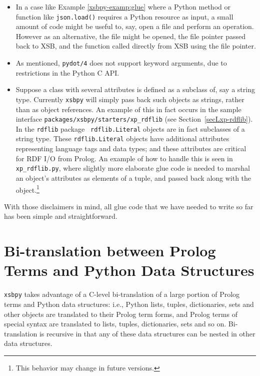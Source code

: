 \begin{itemize}
\item In a case like Example \ref{xsbpy-examp:glue} where a Python
  method or function like {\tt json.load()} requires a Python resource
  as input, a small amount of code might be useful to, say, open a
  file and perform an operation.  However as an alternative, the file
  might be opened, the file pointer passed back to XSB, and the
  function called directly from XSB using the file pointer.

  \item As mentioned, {\tt pydot/4} does not support keyword
    arguments, due to restrictions in the Python C API.

  \item Suppose a class with several attributes is defined as a
    subclass of, say a string type.  Currently {\tt xsbpy} will simply
    pass back such objects as strings, rather than as object
    references.  An example of this in fact occurs in the sample
    interface {\tt packages/xsbpy/starters/xp\_rdflib} (see
    Section~\ref{secLxp-rdflib}).  In the {\tt rdflib} package {\tt
      rdflib.Literal} objects are in fact subclasses of a string type.
    These {\tt rdflib.Literal} objects have additional attributes
    representing language tags and data types; and these attributes
    are critical for RDF I/O from Prolog.  An example of how to handle
    this is seen in {\tt xp\_rdflib.py}, where slightly more elaborate
    glue code is needed to marshal an object's attributes as elements
    of a tuple, and passed back along with the object.\footnote{This
      behavior may change in future versions.}
\end{itemize}

With those disclaimers in mind, all glue code that we have needed to
write so far has been simple and straightforward.

\section{Bi-translation between Prolog Terms and Python Data Structures} \label{sec:bi-translation}

{\tt xsbpy} takes advantage of a C-level bi-translation of a large
portion of Prolog terms and Python data structures: i.e., Python
lists, tuples, dictionaries, sets and other objects are translated to
their Prolog term forms, and Prolog terms of special syntax are
translated to lists, tuples, dictionaries, sets and so on.
Bi-translation is recursive in that any of these data structures can
be nested in other data structures.
     
